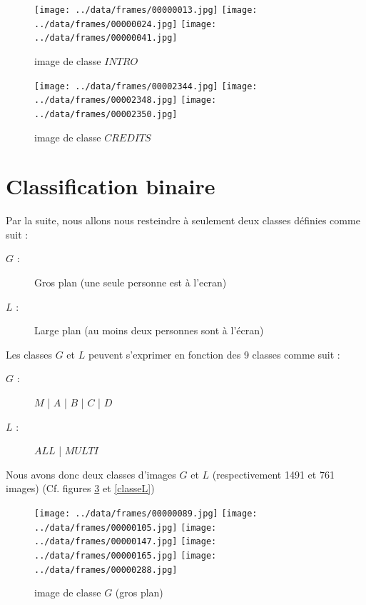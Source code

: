 \documentclass{book}
\begin{document}
\begin{figure}[H]
\begin{center}
\texttt{[image: ../data/frames/00000013.jpg]}
\texttt{[image: ../data/frames/00000024.jpg]}
\texttt{[image: ../data/frames/00000041.jpg]}
\end{center}
\caption{image de classe $INTRO$}
\label{classeINTRO}
\end{figure}

\begin{figure}[H]
\begin{center}
\texttt{[image: ../data/frames/00002344.jpg]}
\texttt{[image: ../data/frames/00002348.jpg]}
\texttt{[image: ../data/frames/00002350.jpg]}
\end{center}
\caption{image de classe $CREDITS$}
\label{classeCREDITS}
\end{figure}

\section{Classification binaire}

Par la suite, nous allons nous resteindre à seulement deux classes définies comme suit :\\
\begin{description} %
\item[$G$ :] \og Gros plan \fg{} (une seule personne est à l'ecran)
\item[$L$ :] \og Large plan \fg{} (au moins deux personnes sont à l'écran)\\
\end{description}


Les classes $G$ et $L$ peuvent s'exprimer en fonction des 9 classes comme suit :\\

\begin{description} %
\item[$G$ :] $M$ | $A$ | $B$ | $C$ | $D$
\item[$L$ :] $ALL$ | $MULTI$\\
\end{description}


Nous avons donc deux classes d'images $G$ et $L$ (respectivement 1491 et 761 images) (Cf. figures \ref{classeG} et
\ref{classeL}) \\

\begin{figure}[H]
\begin{center}
\texttt{[image: ../data/frames/00000089.jpg]}
\texttt{[image: ../data/frames/00000105.jpg]}
\texttt{[image: ../data/frames/00000147.jpg]}
\texttt{[image: ../data/frames/00000165.jpg]}
\texttt{[image: ../data/frames/00000288.jpg]}
\end{center}
\caption{image de classe $G$ (gros plan)}
\label{classeG}
\end{figure}
\end{document}
